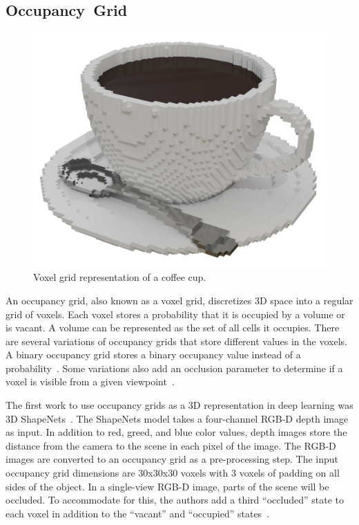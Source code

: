 \subsection{Occupancy~Grid}
\label{subsec:occupancy_grid}

\begin{figure}[h]
	\centering
	\includegraphics[scale=0.2]{Images/Voxel Cup}
	\caption{Voxel grid representation of a coffee cup.}
	\label{fig:voxel_cup}
\end{figure}

An occupancy grid, also known as a voxel grid, discretizes 3D space into a regular grid of voxels. Each voxel stores a probability that it is occupied by a volume or is vacant. A volume can be represented as the set of all cells it occupies. There are several variations of occupancy grids that store different values in the voxels. A binary occupancy grid stores a binary occupancy value instead of a probability~\cite{Konolige1997}. Some variations also add an occlusion parameter to determine if a voxel is visible from a given viewpoint~\cite{Xiao2020}.

The first work to use occupancy grids as a 3D representation in deep learning was 3D ShapeNets~\cite{Wu2015}. The ShapeNets model takes a four-channel RGB-D depth image as input. In addition to red, greed, and blue color values, depth images store the distance from the camera to the scene in each pixel of the image. The RGB-D images are converted to an occupancy grid as a pre-processing step. The input occupancy grid dimensions are 30x30x30 voxels with 3 voxels of padding on all sides of the object. In a single-view RGB-D image, parts of the scene will be occluded. To accommodate for this, the authors add a third ``occluded'' state to each voxel in addition to the ``vacant'' and ``occupied'' states~\cite{Wu2015}.

